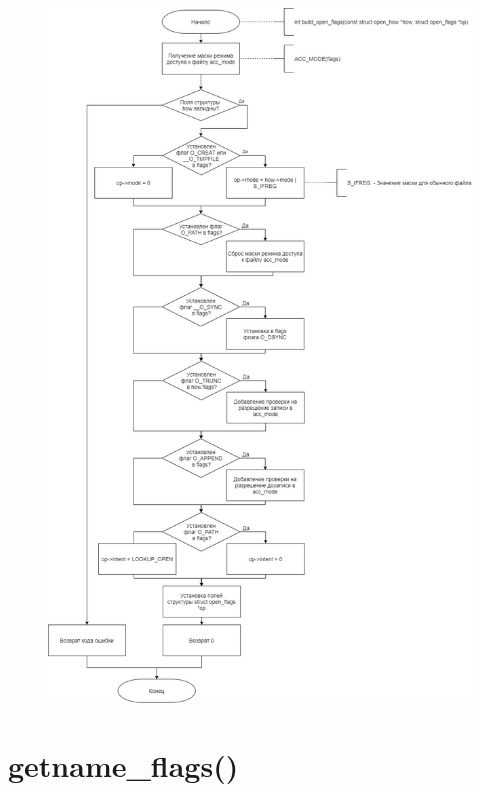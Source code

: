 \documentclass[a4paper,14pt]{extreport}
\begin{document}
\begin{figure}[H]
	\centering
	\includegraphics[scale=0.4]{img/build_open_flags.jpg}
\end{figure}





















\section{getname\_flags()}
\end{document}
